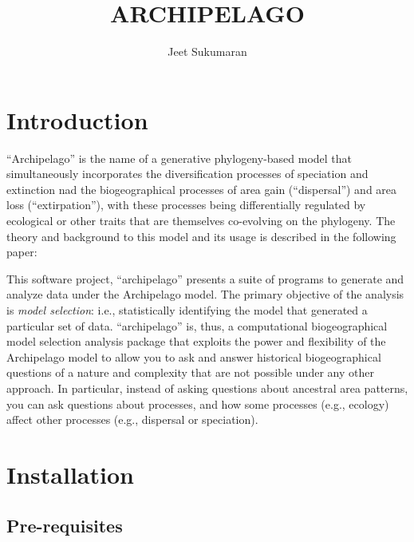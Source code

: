 \documentclass[11pt,openany]{memoir} %
\begin{document}

\title{ARCHIPELAGO}
\author{Jeet Sukumaran}
\maketitle
{}

\tableofcontents

\chapter{Introduction}

``Archipelago'' is the name of a generative phylogeny-based model that simultaneously incorporates the diversification processes of speciation and extinction nad the biogeographical processes of area gain (``dispersal'') and area loss (``extirpation''), with these processes being differentially regulated by ecological or other traits that are themselves co-evolving on the phylogeny.
The theory and background to this model and its usage is described in the following paper:


This software project, ``archipelago'' presents a suite of programs to generate and analyze data under the Archipelago model.
The primary objective of the analysis is \textit{model selection}: i.e., statistically identifying the model that generated a particular set of data.
``archipelago'' is, thus, a computational biogeographical model selection analysis package that exploits the power and flexibility of the Archipelago model to allow you to ask and answer historical biogeographical questions of a nature and complexity that are not possible under any other approach.
In particular, instead of asking questions about ancestral area patterns, you can ask questions about processes, and how some processes (e.g., ecology) affect other processes (e.g., dispersal or speciation).

\chapter{Installation}

\section{Pre-requisites}
\end{document}
